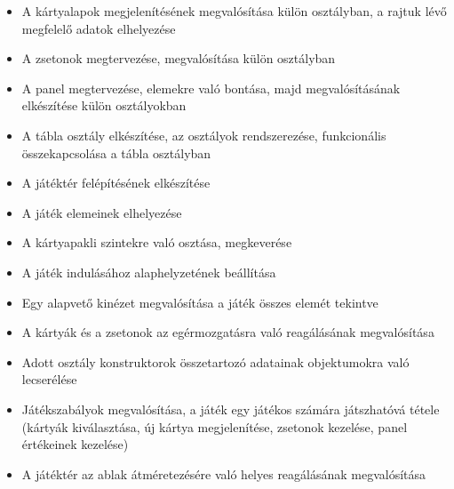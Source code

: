 \begin{itemize}
\item A kártyalapok megjelenítésének megvalósítása külön osztályban, a rajtuk lévő megfelelő adatok elhelyezése
\item A zsetonok megtervezése, megvalósítása külön osztályban
\item A panel megtervezése, elemekre való bontása, majd megvalósításának elkészítése külön osztályokban
\item A tábla osztály elkészítése, az osztályok rendszerezése, funkcionális összekapcsolása a tábla osztályban
\item A játéktér felépítésének elkészítése
\item A játék elemeinek elhelyezése
\item A kártyapakli szintekre való osztása, megkeverése
\item A játék indulásához alaphelyzetének beállítása
\item Egy alapvető kinézet megvalósítása a játék összes elemét tekintve
\item A kártyák és a zsetonok az egérmozgatásra való reagálásának megvalósítása
\item Adott osztály konstruktorok összetartozó adatainak objektumokra való lecserélése
\item Játékszabályok megvalósítása, a játék egy játékos számára játszhatóvá tétele (kártyák kiválasztása, új kártya megjelenítése, zsetonok kezelése, panel értékeinek kezelése)
\item A játéktér az ablak átméretezésére való helyes reagálásának megvalósítása
\end{itemize}









